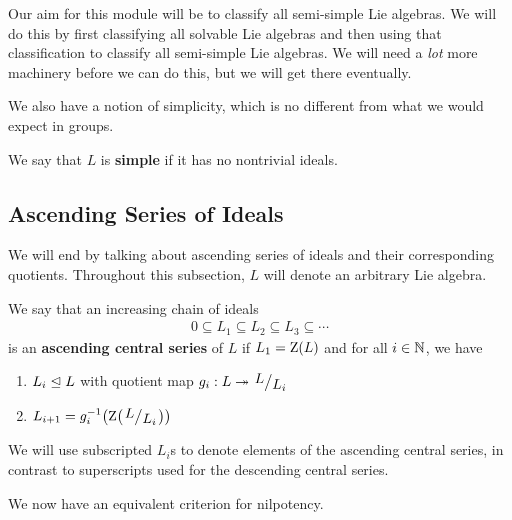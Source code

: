 Our aim for this module will be to classify all semi-simple Lie algebras. We will do this by first classifying all solvable Lie algebras and then using that classification to classify all semi-simple Lie algebras. We will need a \textit{lot} more machinery before we can do this, but we will get there eventually.

We also have a notion of simplicity, which is no different from what we would expect in groups.

\begin{boxdefinition}[Simplicity]
    We say that $L$ is \textbf{simple} if it has no nontrivial ideals.
\end{boxdefinition}

\subsection{Ascending Series of Ideals}

We will end by talking about ascending series of ideals and their corresponding quotients. Throughout this subsection, $L$ will denote an arbitrary Lie algebra.

\begin{boxdefinition}
    We say that an increasing chain of ideals
    \begin{align*}
        0 \subseteq L_1 \subseteq L_2 \subseteq L_3 \subseteq \cdots
    \end{align*}
    is an \textbf{ascending central series} of $L$ if $L_1 = \operatorname{Z}\!\left( L \right)$ and for all $i \in \mathbb{N}$, we have
    \begin{enumerate}
        \item $L_i \trianglelefteq L$ with quotient map $g_i : L \surj \quotient{L}{L_i}$
        \item $L_{i + 1} = g_i\inv\!\parenth{\Zof{\quotient{L}{L_i}}}$
    \end{enumerate}
\end{boxdefinition}

\begin{boxconvention}
    We will use subscripted $L_i$s to denote elements of the ascending central series, in contrast to superscripts used for the descending central series.
\end{boxconvention}

We now have an equivalent criterion for nilpotency.


